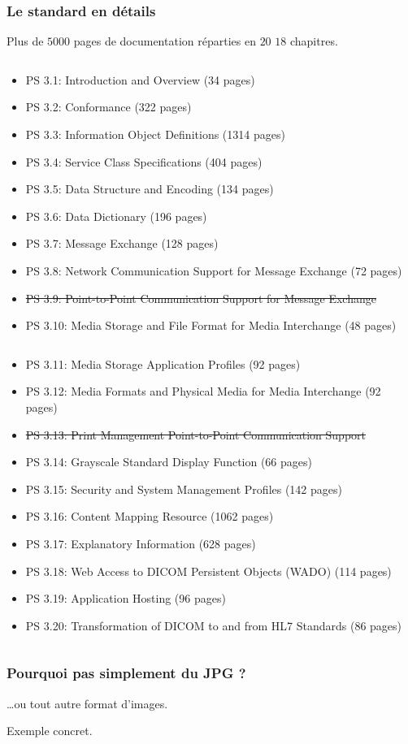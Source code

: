 	\frame
	{
		\frametitle{Le standard en d\'etails}
		Plus de $5000$ pages de documentation r\'eparties en \st{$20$} $18$ chapitres.
		
		\begin{columns}\begin{scriptsize}
	  	\begin{column}[t]{0.5\linewidth}
			\begin{itemize}
				\item PS 3.1: Introduction and Overview (34 pages)
				\item PS 3.2: Conformance (322 pages)
				\item PS 3.3: Information Object Definitions (1314 pages)
				\item PS 3.4: Service Class Specifications (404 pages)
				\item PS 3.5: Data Structure and Encoding (134 pages)
				\item PS 3.6: Data Dictionary (196 pages)
				\item PS 3.7: Message Exchange (128 pages)
				\item PS 3.8: Network Communication Support for Message Exchange (72 pages)
				\item \st{PS 3.9: Point-to-Point Communication Support for Message Exchange}
				\item PS 3.10: Media Storage and File Format for Media Interchange (48 pages)
			\end{itemize}
	  	\end{column}
	  	\begin{column}[t]{0.5\linewidth}
			\begin{itemize}
				\item PS 3.11: Media Storage Application Profiles (92 pages)
				\item PS 3.12: Media Formats and Physical Media for Media Interchange (92 pages)
				\item \st{PS 3.13: Print Management Point-to-Point Communication Support}
				\item PS 3.14: Grayscale Standard Display Function (66 pages)
				\item PS 3.15: Security and System Management Profiles (142 pages)
				\item PS 3.16: Content Mapping Resource (1062 pages)
				\item PS 3.17: Explanatory Information (628 pages)
				\item PS 3.18: Web Access to DICOM Persistent Objects (WADO) (114 pages)
				\item PS 3.19: Application Hosting (96 pages)
				\item PS 3.20: Transformation of DICOM to and from HL7 Standards (86 pages)
			\end{itemize}
	  	\end{column}\end{scriptsize}
	  	\end{columns}
	}

	\frame
	{
		\frametitle{Pourquoi pas simplement du JPG ?}
		\ldots ou tout autre format d'images.

		Exemple concret.
	}

